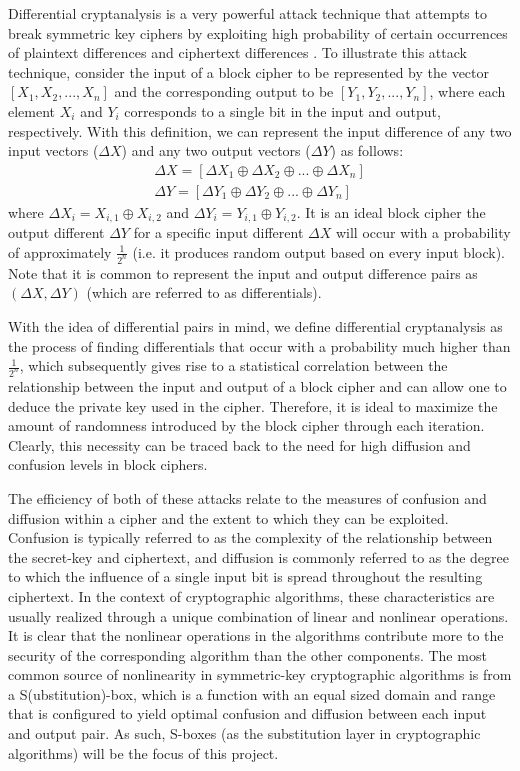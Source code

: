 \documentclass[11pt]{article}
\begin{document}
Differential cryptanalysis is a very powerful attack technique that attempts to break symmetric key ciphers by exploiting high probability of certain occurrences of plaintext differences and ciphertext differences \cite{Heys01atutorial}. To illustrate this attack technique, consider the input of a block cipher to be represented by the vector $[X_1, X_2,..., X_n]$ and the corresponding output to be $[Y_1, Y_2, ..., Y_n]$, where each element $X_i$ and $Y_i$ corresponds to a single bit in the input and output, respectively. With this definition, we can represent the input difference of any two input vectors ($\Delta X$) and any two output vectors ($\Delta Y$) as follows:
\begin{eqnarray*}
\Delta X = [\Delta X_1 \oplus \Delta X_2 \oplus ... \oplus \Delta X_n]  \\
\Delta Y= [\Delta Y_1 \oplus \Delta Y_2 \oplus ... \oplus \Delta Y_n]
\end{eqnarray*}
where $\Delta X_i = X_{i,1} \oplus X_{i,2}$ and $\Delta Y_i = Y_{i,1} \oplus Y_{i,2}$. It is an ideal block cipher the output different $\Delta Y$ for a specific input different $\Delta X$ will occur with a probability of approximately $\frac{1}{2^n}$ (i.e. it produces random output based on every input block). Note that it is common to represent the input and output difference pairs as $(\Delta X, \Delta Y)$ (which are referred to as differentials).

With the idea of differential pairs in mind, we define differential cryptanalysis as the process of finding differentials that occur with a probability much higher than $\frac{1}{2^n}$, which subsequently gives rise to a statistical correlation between the relationship between the input and output of a block cipher and can allow one to deduce the private key used in the cipher. Therefore, it is ideal to maximize the amount of randomness introduced by the block cipher through each iteration. Clearly, this necessity can be traced back to the need for high diffusion and confusion levels in block ciphers.

The efficiency of both of these attacks relate to the measures of confusion and diffusion within a cipher and the extent to which they can be exploited. Confusion is typically referred to as the complexity of the relationship between the secret-key and ciphertext, and diffusion is commonly referred to as the degree to which the influence of a single input bit is spread throughout the resulting ciphertext. In the context of cryptographic algorithms, these characteristics are usually realized through a unique combination of linear and nonlinear operations. It is clear that the nonlinear operations in the algorithms contribute more to the security of the corresponding algorithm than the other components. The most common source of nonlinearity in symmetric-key cryptographic algorithms is from a S(ubstitution)-box, which is a function with an equal sized domain and range that is configured to yield optimal confusion and diffusion between each input and output pair. As such, S-boxes (as the substitution layer in cryptographic algorithms) will be the focus of this project. 
\end{document}
